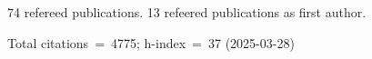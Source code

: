 74 refereed publications. 13 refeered publications as first author.

Total citations~=~4775; h-index~=~37 (2025-03-28)